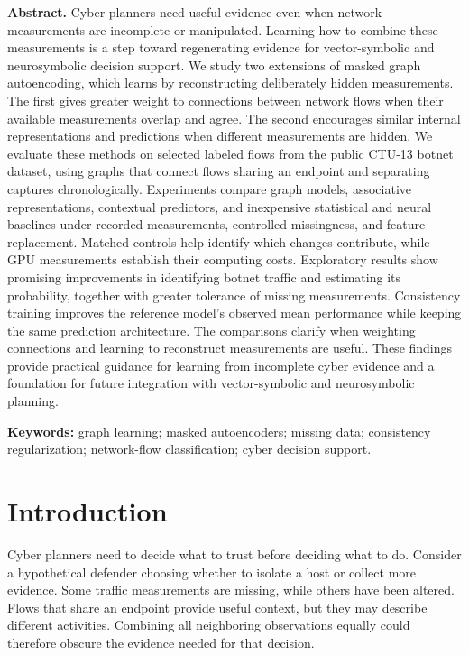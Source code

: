 \documentclass[11pt,letterpaper]{article}
\begin{document}

\begingroup\fontsize{10}{11.5}\selectfont\setlength{\parindent}{0pt}\textbf{Abstract.} Cyber planners need useful evidence even when network measurements are incomplete or manipulated. Learning how to combine these measurements is a step toward regenerating evidence for vector-symbolic and neurosymbolic decision support. We study two extensions of masked graph autoencoding, which learns by reconstructing deliberately hidden measurements. The first gives greater weight to connections between network flows when their available measurements overlap and agree. The second encourages similar internal representations and predictions when different measurements are hidden. We evaluate these methods on selected labeled flows from the public CTU-13 botnet dataset, using graphs that connect flows sharing an endpoint and separating captures chronologically. Experiments compare graph models, associative representations, contextual predictors, and inexpensive statistical and neural baselines under recorded measurements, controlled missingness, and feature replacement. Matched controls help identify which changes contribute, while GPU measurements establish their computing costs. Exploratory results show promising improvements in identifying botnet traffic and estimating its probability, together with greater tolerance of missing measurements. Consistency training improves the reference model's observed mean performance while keeping the same prediction architecture. The comparisons clarify when weighting connections and learning to reconstruct measurements are useful. These findings provide practical guidance for learning from incomplete cyber evidence and a foundation for future integration with vector-symbolic and neurosymbolic planning.\par\endgroup\vspace{5pt}

\noindent \textbf{Keywords:} graph learning; masked autoencoders; missing data; consistency regularization; network-flow classification; cyber decision support.\par

\section{Introduction}

Cyber planners need to decide what to trust before deciding what to do. Consider a hypothetical defender choosing whether to isolate a host or collect more evidence. Some traffic measurements are missing, while others have been altered. Flows that share an endpoint provide useful context, but they may describe different activities. Combining all neighboring observations equally could therefore obscure the evidence needed for that decision.\par
\end{document}
